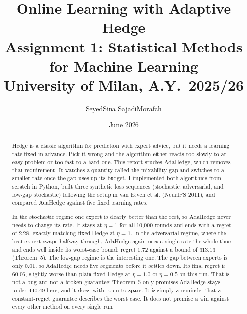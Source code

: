 \documentclass[11pt,a4paper]{article}
\title{%
  \textbf{Online Learning with Adaptive Hedge} \\[4pt]
  {\large Assignment 1: Statistical Methods for Machine Learning} \\[2pt]
  {\normalsize University of Milan, A.Y.\ 2025/26}
}
\author{%
  SeyedSina SajadiMorafah
}
\date{June 2026}
\begin{document}
\maketitle
\thispagestyle{empty}

\begin{center}
\end{center}

\vspace{1em}

\begin{abstract}
Hedge is a classic algorithm for prediction with expert advice, but it needs a
learning rate fixed in advance. Pick it wrong and the algorithm either reacts
too slowly to an easy problem or too fast to a hard one. This report studies
AdaHedge, which removes that requirement. It watches a quantity called the
mixability gap and switches to a smaller rate once the gap uses up its budget.
I implemented both algorithms from scratch in Python, built three synthetic
loss sequences (stochastic, adversarial, and low-gap stochastic) following the
setup in van Erven et al. (NeurIPS 2011), and compared AdaHedge against five
fixed learning rates.

In the stochastic regime one expert is clearly better than the rest, so
AdaHedge never needs to change its rate. It stays at $\eta=1$ for all
10{,}000 rounds and ends with a regret of $2.28$, exactly matching fixed Hedge
at $\eta=1$. In the adversarial regime, where the best expert swaps halfway
through, AdaHedge again uses a single rate the whole time and ends well
inside its worst-case bound: regret $1.72$ against a bound of $313.13$
(Theorem~5). The low-gap regime is the interesting one. The gap between
experts is only $0.01$, so AdaHedge needs five segments before it settles
down. Its final regret is $60.06$, slightly worse than plain fixed Hedge at
$\eta=1.0$ or $\eta=0.5$ on this run. That is not a bug and not a broken
guarantee: Theorem~5 only promises AdaHedge stays under $440.49$ here, and it
does, with room to spare. It is simply a reminder that a constant-regret
guarantee describes the worst case. It does not promise a win against every
other method on every single run.
\end{abstract}
\end{document}
